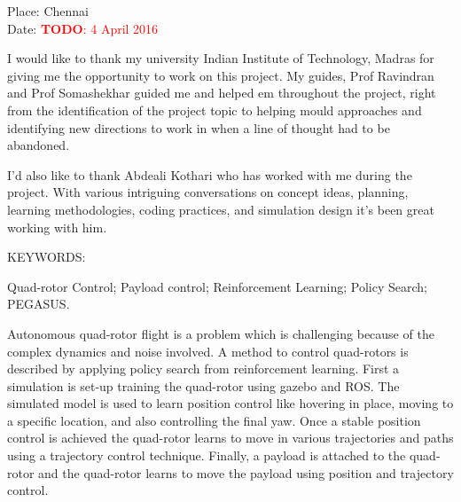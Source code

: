 \documentclass[hidelinks,BTech]{iitmdiss}
\newcommand\todo[1]{\textcolor{red}{{\bf TODO}: #1}}
\begin{document}
\vspace*{0.25in}
\noindent Place: Chennai\\
Date: \todo{4 April 2016}


\acknowledgements

I would like to thank my university Indian Institute of Technology, Madras for giving me the opportunity to work on this project. My guides, Prof Ravindran and Prof Somashekhar guided me and helped em throughout the project, right from the identification of the project topic to helping mould approaches and identifying new directions to work in when a line of thought had to be abandoned.

I'd also like to thank Abdeali Kothari who has worked with me during the project. With various intriguing conversations on concept ideas, planning, learning methodologies, coding practices, and simulation design it's been great working with him. 


\abstract

\noindent KEYWORDS: \hspace*{0.5em} \parbox[t]{4.4in}{Quad-rotor Control; Payload control; Reinforcement Learning; Policy Search; PEGASUS.}

\vspace*{24pt}

\noindent Autonomous quad-rotor flight is a problem which is challenging because of the complex dynamics and noise involved. A method to control quad-rotors is described by applying policy search from reinforcement learning. First a simulation is set-up training the quad-rotor using gazebo and ROS. The simulated model is used to learn position control like hovering in place, moving to a specific location, and also controlling the final yaw. Once a stable position control is achieved the quad-rotor learns to move in various trajectories and paths using a trajectory control technique. Finally, a payload is attached to the quad-rotor and the quad-rotor learns to move the payload using position and trajectory control.

\pagebreak


\begin{singlespace}
\clearpage
{}
{}
\tableofcontents


\listoffigures
{}
\end{singlespace}
\end{document}
